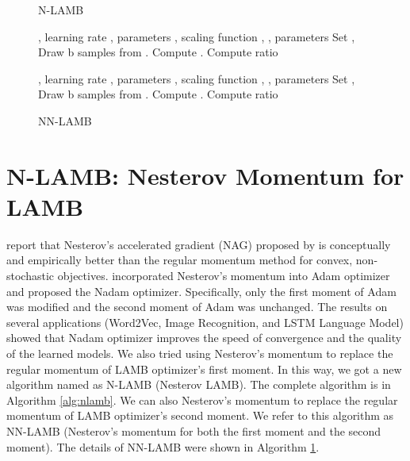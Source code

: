 \documentclass{article} \usepackage{iclr2020_conference,times}
\begin{document}
\begin{figure}
\begin{minipage}[b]{.48\textwidth}

\begin{algorithm}[H]\small
	\caption{N-LAMB}
	\label{alg:nlamb}
	\begin{algorithmic}
		 , learning rate ,  parameters , scaling function , , parameters 
		\STATE Set , 
		\STATE Draw b samples  from .
        \STATE Compute .
\STATE   
		\STATE 
		\STATE  
		\STATE 
		\STATE Compute ratio 
		\STATE 
		\ENDFOR
	\end{algorithmic}
\end{algorithm}

\end{minipage}\hfill \begin{minipage}[b]{.5\textwidth}

\begin{algorithm}[H]\small
	\caption{NN-LAMB}
	\label{alg:nnlamb}
	\begin{algorithmic}
		 , learning rate ,  parameters , scaling function , , parameters 
		\STATE Set , 
		\FOR{ {\bf to} }
		\STATE Draw b samples  from .
        \STATE Compute .
\STATE   
		\STATE 
		\STATE  
\STATE 
		\STATE Compute ratio 
		\STATE 
		\ENDFOR
	\end{algorithmic}
\end{algorithm}

\end{minipage}
\end{figure}

\section{N-LAMB: Nesterov Momentum for LAMB}

\cite{sutskever2013importance} report that Nesterov’s accelerated gradient (NAG) proposed by \cite{nesterov1983method} is conceptually and empirically better than the regular momentum method for convex, non-stochastic objectives.
\cite{dozat2016incorporating} incorporated Nesterov’s momentum into Adam optimizer and proposed the Nadam optimizer. Specifically, only the first moment of Adam was modified and the second moment of Adam was unchanged. The results on several applications (Word2Vec, Image Recognition, and LSTM Language Model) showed that Nadam optimizer improves the speed of convergence and the quality of the learned models. We also tried using Nesterov’s momentum to replace the regular momentum of LAMB optimizer's first moment. In this way, we got a new algorithm named as N-LAMB (Nesterov LAMB). The complete algorithm is in Algorithm \ref{alg:nlamb}. We can also Nesterov’s momentum to replace the regular momentum of LAMB optimizer's second moment. We refer to this algorithm as NN-LAMB (Nesterov's momentum for both the first moment and the second moment). The details of NN-LAMB were shown in Algorithm \ref{alg:nnlamb}.
\end{document}
